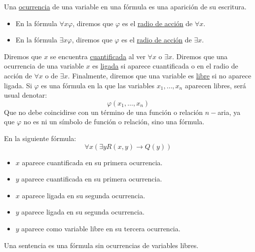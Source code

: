 \begin{definicion}
    Una \underline{ocurrencia} de una variable en una fórmula es una aparición de su escritura.
    \begin{itemize}
        \item En la fórmula $\forall x\varphi$, diremos que $\varphi$ es el \underline{radio de acción} de $\forall x$.
        \item En la fórmula $\exists x\varphi$, diremos que $\varphi$ es el \underline{radio de acción} de $\exists x$.
    \end{itemize}
    Diremos que $x$ se encuentra \underline{cuantificada} al ver $\forall x$ o $\exists x$.\newline
    Diremos que una ocurrencia de una variable $x$ es \underline{ligada} si aparece cuantificada o en el radio de acción de $\forall x$ o de $\exists x$.\newline
    Finalmente, diremos que una variable es \underline{libre} si no aparece ligada. Si $\varphi$ es una fórmula en la que las variables $x_1,\ldots,x_n$ aparecen libres, será usual denotar:
    \begin{equation*}
        \varphi(x_1,\ldots,x_n)
    \end{equation*}
    Que no debe coincidirse con un término de una función o relación $n-$aria, ya que $\varphi$ no es ni un símbolo de función o relación, sino una fórmula.
\end{definicion}

\begin{ejemplo}
    En la siguiente fórmula:
    \begin{equation*}
        \forall x(\exists yR(x,y)\to Q(y))
    \end{equation*}
    \begin{itemize}
        \item $x$ aparece cuantificada en su primera ocurrencia.
        \item $y$ aparece cuantificada en su primera ocurrencia.
        \item $x$ aparece ligada en su segunda ocurrencia.
        \item $y$ aparece ligada en su segunda ocurrencia.
        \item $y$ aparece como variable libre en su tercera ocurrencia.
    \end{itemize}
\end{ejemplo}

\begin{definicion}[Sentencia]
    Una sentencia es una fórmula sin ocurrencias de variables libres.
\end{definicion}

